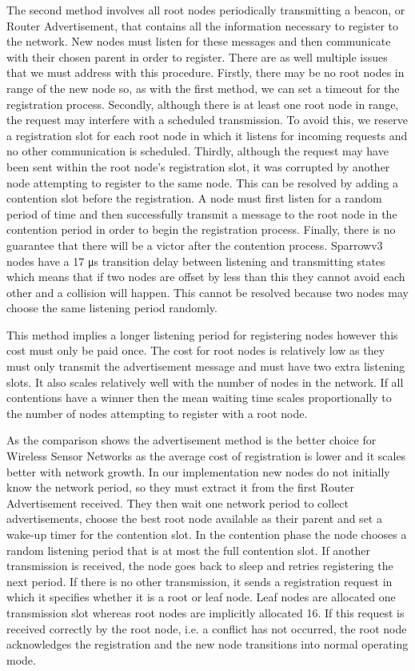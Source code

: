 The second method involves all root nodes periodically transmitting a beacon,
or Router Advertisement, that contains all the information necessary to
register to the network. New nodes must listen for these messages and then
communicate with their chosen parent in order to register.  There are as well
multiple issues that we must address with this procedure. Firstly, there may be
no root nodes in range of the new node so, as with the first method, we can set
a timeout for the registration process. Secondly, although there is at least
one root node in range, the request may interfere with a scheduled
transmission. To avoid this, we reserve a registration slot for each root node
in which it listens for incoming requests and no other communication is
scheduled. Thirdly, although the request may have been sent within the root
node's registration slot, it was corrupted by another node attempting to
register to the same node. This can be resolved by adding a contention slot
before the registration. A node must first listen for a random period of time
and then successfully transmit a message to the root node in the contention
period in order to begin the registration process. Finally, there is no
guarantee that there will be a victor after the contention process. Sparrowv3
nodes have a 17 μs transition delay between listening and transmitting states
which means that if two nodes are offset by less than this they cannot avoid
each other and a collision will happen. This cannot be resolved because two
nodes may choose the same listening period randomly.

This method implies a longer listening period for registering nodes however
this cost must only be paid once. The cost for root nodes is relatively low as
they must only transmit the advertisement message and must have two extra
listening slots. It also scales relatively well with the number of nodes in the
network.  If all contentions have a winner then the mean waiting time scales
proportionally to the number of nodes attempting to register with a root node. 

\vspace{\baselineskip}

As the comparison shows the advertisement method is the better choice for
Wireless Sensor Networks as the average cost of registration is lower and it
scales better with network growth. In our implementation new nodes do not
initially know the network period, so they must extract it from the first
Router Advertisement received. They then wait one network period to collect
advertisements, choose the best root node available as their parent and set a
wake-up timer for the contention slot. In the contention phase the node chooses
a random listening period that is at most the full contention slot. If another
transmission is received, the node goes back to sleep and retries registering
the next period. If there is no other transmission, it sends a registration
request in which it specifies whether it is a root or leaf node.  Leaf nodes
are allocated one transmission slot whereas root nodes are implicitly allocated
16. If this request is received correctly by the root node, i.e. a conflict has
not occurred, the root node acknowledges the registration and the new node
transitions into normal operating mode.

